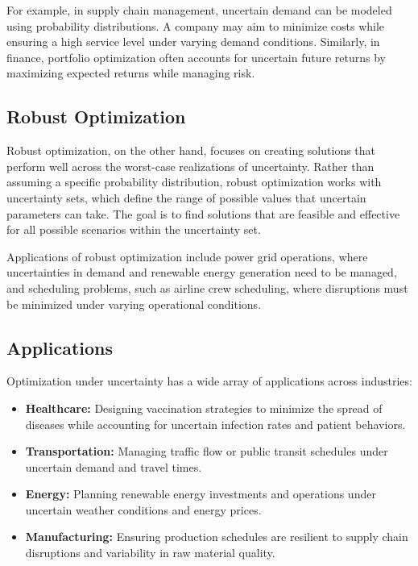 For example, in supply chain management, uncertain demand can be modeled using probability distributions. A company may aim to minimize costs while ensuring a high service level under varying demand conditions. Similarly, in finance, portfolio optimization often accounts for uncertain future returns by maximizing expected returns while managing risk.

\subsection{Robust Optimization}

Robust optimization, on the other hand, focuses on creating solutions that perform well across the worst-case realizations of uncertainty. Rather than assuming a specific probability distribution, robust optimization works with uncertainty sets, which define the range of possible values that uncertain parameters can take. The goal is to find solutions that are feasible and effective for all possible scenarios within the uncertainty set.

Applications of robust optimization include power grid operations, where uncertainties in demand and renewable energy generation need to be managed, and scheduling problems, such as airline crew scheduling, where disruptions must be minimized under varying operational conditions.

\subsection{Applications}

Optimization under uncertainty has a wide array of applications across industries:
\begin{itemize}
    \item \textbf{Healthcare:} Designing vaccination strategies to minimize the spread of diseases while accounting for uncertain infection rates and patient behaviors.
    \item \textbf{Transportation:} Managing traffic flow or public transit schedules under uncertain demand and travel times.
    \item \textbf{Energy:} Planning renewable energy investments and operations under uncertain weather conditions and energy prices.
    \item \textbf{Manufacturing:} Ensuring production schedules are resilient to supply chain disruptions and variability in raw material quality.
\end{itemize}

